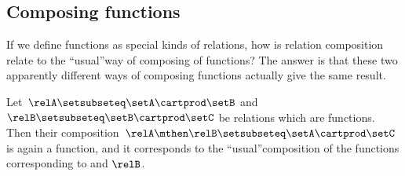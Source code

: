 \subsection{Composing functions}

If we define functions as special kinds of relations, how is relation composition relate to the ``usual''way of composing of functions?
The answer is that these two apparently different ways of composing functions actually give the same result.

\begin{lemma}
    \label{lem:comprelfun}
    Let~$\relA \setsubseteq \setA \cartprod \setB$ and~$\relB \setsubseteq \setB \cartprod \setC$ be relations which are functions.
    Then their composition~$\relA \mthen \relB \setsubseteq \setA \cartprod \setC$ is again a function, and it corresponds to the ``usual''composition of the functions corresponding to \relA and $\relB$.
\end{lemma}


